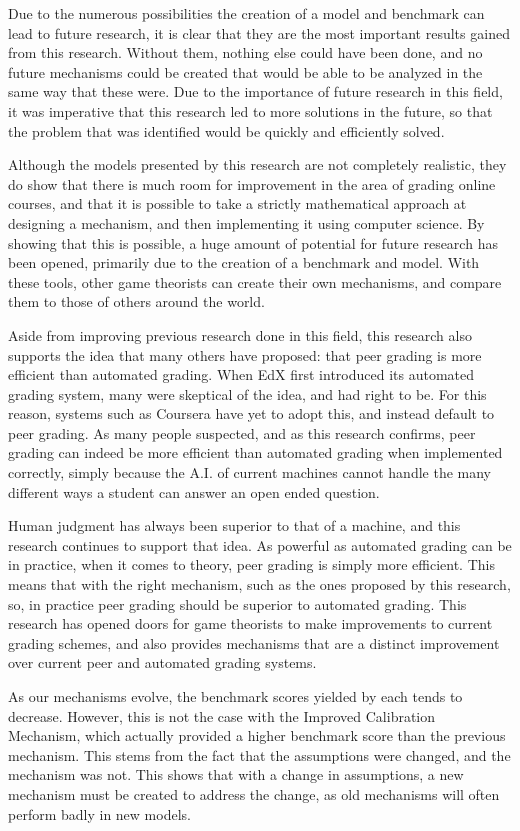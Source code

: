 \documentclass[12pt, Arial]{article}
\begin{document}
Due to the numerous possibilities the creation of a model and benchmark can lead to future research, it is clear that they are the most important results gained from this research. Without them, nothing else could have been done, and no future mechanisms could be created that would be able to be analyzed in the same way that these were. Due to the importance of future research in this field, it was imperative that this research led to more solutions in the future, so that the problem that was identified would be quickly and efficiently solved.

Although the models presented by this research are not completely realistic, they do show that there is much room for improvement in the area of grading online courses, and that it is possible to take a strictly mathematical approach at designing a mechanism, and then implementing it using computer science. By showing that this is possible, a huge amount of potential for future research has been opened, primarily due to the creation of a benchmark and model. With these tools, other game theorists can create their own mechanisms, and compare them to those of others around the world.

Aside from improving previous research done in this field, this research also supports the idea that many others have proposed: that peer grading is more efficient than automated grading. When EdX first introduced its automated grading system, many were skeptical of the idea, and had right to be. For this reason, systems such as Coursera have yet to adopt this, and instead default to peer grading. As many people suspected, and as this research confirms, peer grading can indeed be more efficient than automated grading when implemented correctly, simply because the A.I. of current machines cannot handle the many different ways a student can answer an open ended question.

Human judgment has always been superior to that of a machine, and this research continues to support that idea. As powerful as automated grading can be in practice, when it comes to theory, peer grading is simply more efficient. This means that with the right mechanism, such as the ones proposed by this research, so, in practice peer grading should be superior to automated grading. This research has opened doors for game theorists to make improvements to current grading schemes, and also provides mechanisms that are a distinct improvement over current peer and automated grading systems.

As our mechanisms evolve, the benchmark scores yielded by each tends to decrease. However, this is not the case with the Improved Calibration Mechanism, which actually provided a higher benchmark score than the previous mechanism. This stems from the fact that the assumptions were changed, and the mechanism was not. This shows that with a change in assumptions, a new mechanism must be created to address the change, as old mechanisms will often perform badly in new models.
\end{document}
